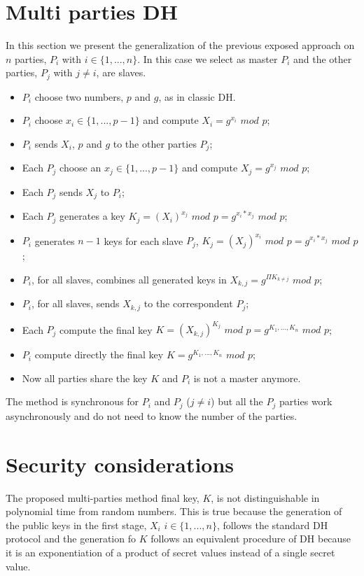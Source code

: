 \documentclass[11pt]{article}
\begin{document}
\section{Multi parties DH}

In this section we present the generalization of the previous exposed approach on $n$ parties, $P_i$ with $i \in \{1, ..., n\}$. In this case we select as master $P_i$ and the other parties, $P_j$ with $j \neq i$, are slaves.

\begin{itemize}
    \item $P_i$ choose two numbers, $p$ and $g$, as in classic DH.
    \item $P_i$ choose $x_i \in \{1, ..., p-1\}$ and compute $X_i = g^{x_i}$ $mod$ $p$;
    \item $P_i$ sends $X_i$, $p$ and $g$ to the other parties $P_j$;
    \item Each $P_j$ choose an $x_j \in \{1, ..., p-1\}$ and compute $X_j = g^{x_j}$ $mod$ $p$;
    \item Each $P_j$ sends $X_j$ to $P_i$;
    \item Each $P_j$ generates a key $K_j = (X_i)^{x_j}$ $mod$ $p = g^{x_i*x_j}$ $mod$ $p$;
    \item $P_i$ generates $n-1$ keys for each slave $P_j$, $K_j = (X_j)^{x_i}$ $mod$ $p = g^{x_i*x_j}$ $mod$ $p$;
    \item $P_i$, for all slaves, combines all generated keys in $X_{k,j} = g^{\Pi K_{k \neq j} }$ $mod$ $p$;
    \item $P_i$, for all slaves, sends $X_{k,j}$ to the correspondent $P_j$;
    \item Each $P_j$ compute the final key $K = (X_{k,j})^{K_j}$ $mod$ $p = g^{K_1,...,K_n}$ $mod$ $p$;
    \item $P_i$ compute directly the final key $K = g^{K_1,...,K_n}$ $mod$ $p$;
    \item Now all parties share the key $K$ and $P_i$ is not a master anymore.
\end{itemize}

The method is synchronous for $P_i$ and $P_j$ ($j \neq i$) but all the $P_j$ parties work asynchronously and do not need to know the number of the parties.

\section{Security considerations}

The proposed multi-parties method final key, $K$, is not distinguishable in polynomial time from random numbers. This is true because the generation of the public keys in the first stage, $X_i$ $i \in \{1, ..., n\}$, follows the standard DH protocol and the generation fo $K$ follows an equivalent procedure of DH because it is an exponentiation of a product of secret values instead of a single secret value.
\end{document}
